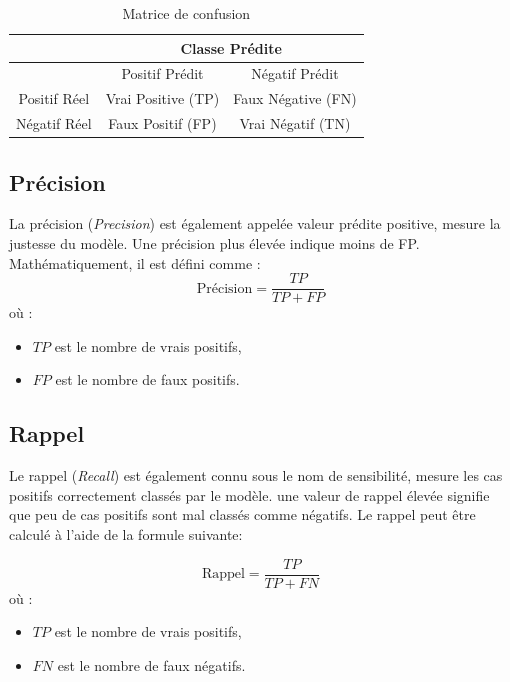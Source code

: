 


\begin{table}[h!]
    \centering
    \begin{tabular}{|c|c|c|}
        \hline
        & \multicolumn{2}{c|}{Classe Prédite} \\ \hline
        & Positif Prédit & Négatif Prédit \\ \hline
        Positif Réel & Vrai Positive (TP) & Faux Négative (FN) \\ \hline
        Négatif Réel & Faux Positif (FP) & Vrai Négatif (TN) \\ \hline
    \end{tabular}
    \caption{Matrice de confusion}
    \label{tab:confusion_matrix}
\end{table}






\subsection{Précision}
La précision (\textit{Precision}) \cite{vilares2015lexicon} est également appelée valeur prédite positive, mesure la justesse
du modèle. Une précision plus élevée indique moins de FP. Mathématiquement, il est
défini comme : 
\begin{equation}
\text{Précision} = \frac{TP}{TP + FP}
\end{equation}
où :
\begin{itemize}
  \item $TP$ est le nombre de vrais positifs,
  \item $FP$ est le nombre de faux positifs.
\end{itemize}

\subsection{Rappel}
Le rappel (\textit{Recall}) \cite{vilares2015lexicon}  est également connu sous le nom de sensibilité, mesure les cas positifs correctement classés par le modèle.  une valeur de rappel élevée signifie que peu de cas positifs sont mal classés comme négatifs. Le rappel peut être calculé à l'aide de la formule suivante: 

\begin{equation}
\text{Rappel} = \frac{TP}{TP + FN}
\end{equation}
où :
\begin{itemize}
  \item $TP$ est le nombre de vrais positifs,
  \item $FN$ est le nombre de faux négatifs.
\end{itemize}


